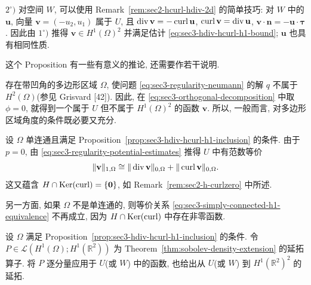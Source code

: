 \begin{Proof}
$2^\circ)$ 对空间 $W$, 可以使用 Remark~\ref{rem:sec2-hcurl-hdiv-2d} 的简单技巧:
对 $W$ 中的 $\mathbf u$, 向量 $\mathbf v=(-u_2,u_1)$ 属于 $U$, 且
$\operatorname{div}\mathbf v=-\operatorname{curl}\mathbf u$, $\operatorname{curl}\mathbf v=\operatorname{div}\mathbf u$,
$\mathbf v\cdot\mathbf n=-\mathbf u\cdot\boldsymbol\tau$.
因此由 $1^\circ)$ 推得 $\mathbf v\in H^1(\Omega)^2$ 并满足估计
\eqref{eq:sec3-hdiv-hcurl-h1-bound}; $\mathbf u$ 也具有相同性质.
\end{Proof}

这个 Proposition 有一些有意义的推论, 还需要作若干说明.

\setcounter{statement}{3}
\begin{Remark}\label{rem:sec3-reentrant-corner-counterexample}
存在带凹角的多边形区域 $\Omega$, 使问题 \eqref{eq:sec3-regularity-neumann}
的解 $q$ 不属于 $H^2(\Omega)$(参见 Grisvard [42]). 因此, 在
\eqref{eq:sec3-orthogonal-decomposition} 中取 $\phi=0$, 就得到一个属于 $U$ 但不属于
$H^1(\Omega)^2$ 的函数 $\mathbf v$. 所以, 一般而言, 对多边形区域角度的条件既必要又充分.
\end{Remark}

\setcounter{statement}{4}
\begin{Remark}\label{rem:sec3-simply-connected-norm-equivalence}
设 $\Omega$ 单连通且满足 Proposition~\ref{prop:sec3-hdiv-hcurl-h1-inclusion} 的条件.
由于 $p=0$, 由 \eqref{eq:sec3-regularity-potential-estimates} 推得 $U$ 中有范数等价
\begin{equation}\label{eq:sec3-simply-connected-h1-equivalence}
\|\mathbf v\|_{1,\Omega}\cong
\|\operatorname{div}\mathbf v\|_{0,\Omega}+\|\operatorname{curl}\mathbf v\|_{0,\Omega}.
\end{equation}
这又蕴含 $H\cap\operatorname{Ker}(\operatorname{curl})=\{\mathbf0\}$, 如
Remark~\ref{rem:sec2-h-curlzero} 中所述.

另一方面, 如果 $\Omega$ 不是单连通的, 则等价关系
\eqref{eq:sec3-simply-connected-h1-equivalence} 不再成立, 因为
$H\cap\operatorname{Ker}(\operatorname{curl})$ 中存在非零函数.
\end{Remark}

\setcounter{statement}{5}
\begin{Remark}\label{rem:sec3-extension-hdiv-hcurl}
设 $\Omega$ 满足 Proposition~\ref{prop:sec3-hdiv-hcurl-h1-inclusion} 的条件.
令 $P\in\mathcal L(H^1(\Omega);H^1(\mathbb R^2))$ 为
Theorem~\ref{thm:sobolev-density-extension} 的延拓算子. 将 $P$ 逐分量应用于 $U$(或 $W$)
中的函数, 也给出从 $U$(或 $W$) 到 $H^1(\mathbb R^2)^2$ 的延拓.
\end{Remark}

\setcounter{subsection}{2}
